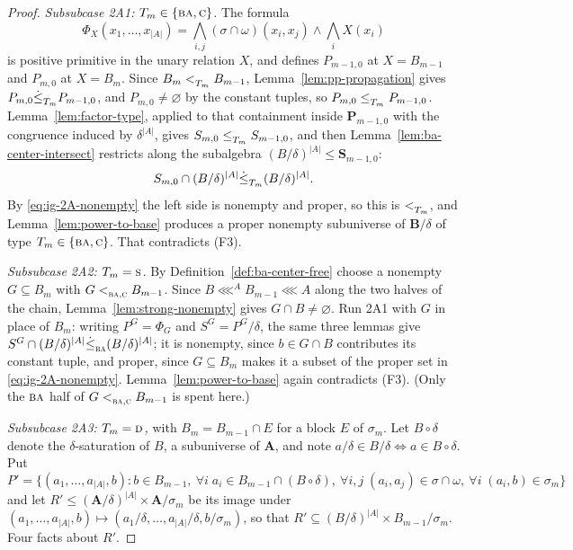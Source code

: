 \begin{proof}
\emph{Subsubcase 2A1: $T_{m}\in\{\textup{\textsc{ba}},\textup{\textsc{c}}\}$.} The formula
\[
  \Phi_{X}(x_{1},\dots,x_{|A|})=
  \bigwedge_{i,j}(\sigma\cap\omega)(x_{i},x_{j})\wedge\bigwedge_{i}X(x_{i})
\]
is positive primitive in the unary relation $X$, and defines $P_{m-1,0}$ at
$X=B_{m-1}$ and $P_{m,0}$ at $X=B_{m}$. Since $B_{m}<_{T_{m}}^{}B_{m-1}$,
Lemma~\ref{lem:pp-propagation} gives $P_{m,0}\dot\le_{T_{m}}^{}P_{m-1,0}$, and
$P_{m,0}\neq\varnothing$ by the constant tuples, so
$P_{m,0}\le_{T_{m}}^{}P_{m-1,0}$. Lemma~\ref{lem:factor-type}, applied to that
containment inside $\mathbf P_{m-1,0}$ with the congruence induced by
$\delta^{|A|}$, gives $S_{m,0}\le_{T_{m}}^{}S_{m-1,0}$, and then
Lemma~\ref{lem:ba-center-intersect} restricts along the subalgebra
$(B/\delta)^{|A|}\le\mathbf S_{m-1,0}$:
\[
  S_{m,0}\cap(B/\delta)^{|A|}\dot\le_{T_{m}}^{}(B/\delta)^{|A|} .
\]
By \eqref{eq:ig-2A-nonempty} the left side is nonempty and proper, so this is
$<_{T_{m}}^{}$, and Lemma~\ref{lem:power-to-base} produces a proper nonempty
subuniverse of $\mathbf B/\delta$ of type $T_{m}\in\{\textup{\textsc{ba}},\textup{\textsc{c}}\}$. That
contradicts (F3).

\emph{Subsubcase 2A2: $T_{m}=\textup{\textsc{s}}$.} By Definition~\ref{def:ba-center-free}
choose a nonempty $G\subseteq B_{m}$ with $G<_{\textup{\textsc{ba}},\textup{\textsc{c}}}^{}B_{m-1}$. Since
$B\lll^{A}B_{m-1}\lll A$ along the two halves of the chain,
Lemma~\ref{lem:strong-nonempty} gives $G\cap B\neq\varnothing$. Run 2A1 with
$G$ in place of $B_{m}$: writing $P^{G}=\Phi_{G}$ and $S^{G}=P^{G}/\delta$,
the same three lemmas give $S^{G}\cap(B/\delta)^{|A|}\dot\le_{\textup{\textsc{ba}}}^{}
(B/\delta)^{|A|}$; it is nonempty, since $b\in G\cap B$ contributes its
constant tuple, and proper, since $G\subseteq B_{m}$ makes it a subset of the
proper set in \eqref{eq:ig-2A-nonempty}. Lemma~\ref{lem:power-to-base} again
contradicts (F3). (Only the $\textup{\textsc{ba}}$ half of $G<_{\textup{\textsc{ba}},\textup{\textsc{c}}}^{}B_{m-1}$ is spent
here.)

\emph{Subsubcase 2A3: $T_{m}=\textup{\textsc{d}}$,} with $B_{m}=B_{m-1}\cap E$ for a block $E$
of $\sigma_{m}$. Let $B\circ\delta$ denote the $\delta$-saturation of $B$,
a subuniverse of $\mathbf A$, and note $a/\delta\in B/\delta\iff a\in
B\circ\delta$. Put
\[
  P'=\bigl\{(a_{1},\dots,a_{|A|},b): b\in B_{m-1},\ \forall i\;
    a_{i}\in B_{m-1}\cap(B\circ\delta),\ \forall i,j\;(a_{i},a_{j})\in
    \sigma\cap\omega,\ \forall i\;(a_{i},b)\in\sigma_{m}\bigr\}
\]
and let $R'\le(\mathbf A/\delta)^{|A|}\times\mathbf A/\sigma_{m}$ be its image
under $(a_{1},\dots,a_{|A|},b)\mapsto(a_{1}/\delta,\dots,a_{|A|}/\delta,
b/\sigma_{m})$, so that $R'\subseteq(B/\delta)^{|A|}\times B_{m-1}/\sigma_{m}$.
Four facts about $R'$.


\end{proof}
